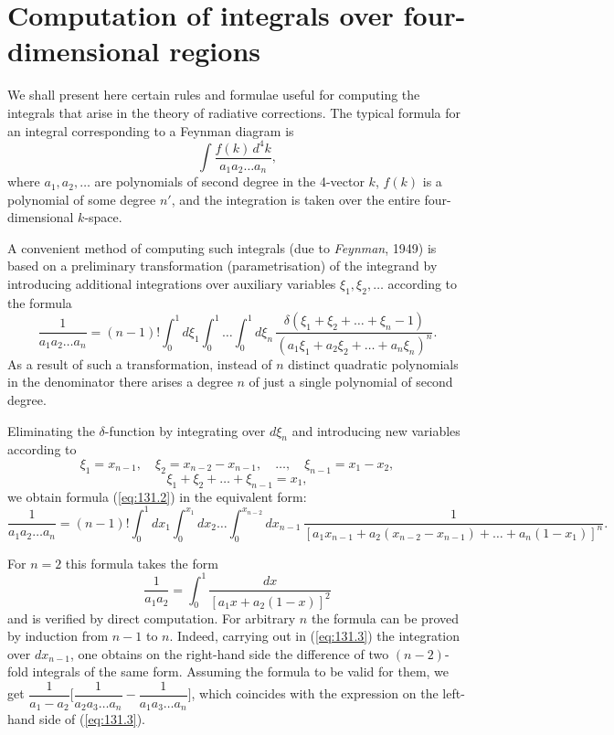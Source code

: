 
\section{Computation of integrals over four-dimensional regions}


We shall present here certain rules and formulae useful for computing the integrals that arise in the theory of radiative corrections. The typical formula for an integral corresponding to a Feynman diagram is
\begin{equation}
\int \frac{f(k)\,d^4k}{a_1 a_2 \ldots a_n},
\label{eq:131.1}
\end{equation}
where $a_1, a_2, \ldots$ are polynomials of second degree in the 4-vector $k$, $f(k)$ is a polynomial of some degree $n'$, and the integration is taken over the entire four-dimensional $k$-space.

A convenient method of computing such integrals (due to \emph{Feynman}, 1949) is based on a preliminary transformation (parametrisation) of the integrand by introducing additional integrations over auxiliary variables $\xi_1, \xi_2, \ldots$ according to the formula
\begin{equation}
\frac{1}{a_1 a_2 \ldots a_n} = (n-1)! \int_0^1 d\xi_1 \int_0^1 \ldots \int_0^1 d\xi_n \,\frac{\delta(\xi_1 + \xi_2 + \ldots + \xi_n - 1)}{(a_1\xi_1 + a_2\xi_2 + \ldots + a_n\xi_n)^n}.
\label{eq:131.2}
\end{equation}
As a result of such a transformation, instead of $n$ distinct quadratic polynomials in the denominator there arises a degree $n$ of just a single polynomial of second degree.

Eliminating the $\delta$-function by integrating over $d\xi_n$ and introducing new variables according to
\[
\xi_1 = x_{n-1},\quad \xi_2 = x_{n-2} - x_{n-1},\quad \ldots, \quad \xi_{n-1} = x_1 - x_2,
\]
\[
\xi_1 + \xi_2 + \ldots + \xi_{n-1} = x_1,
\]
we obtain formula (\ref{eq:131.2}) in the equivalent form:
\begin{equation}
\frac{1}{a_1 a_2 \ldots a_n} = (n-1)! \int_0^1 dx_1 \int_0^{x_1} dx_2 \ldots \int_0^{x_{n-2}} dx_{n-1}\,\frac{1}{[a_1 x_{n-1} + a_2(x_{n-2} - x_{n-1}) + \ldots + a_n(1 - x_1)]^n}.
\label{eq:131.3}
\end{equation}


For $n = 2$ this formula takes the form
\begin{equation}
\frac{1}{a_1 a_2} = \int_0^1 \frac{dx}{[a_1 x + a_2(1-x)]^2}
\label{eq:131.4}
\end{equation}
and is verified by direct computation. For arbitrary $n$ the formula can be proved by induction from $n - 1$ to $n$. Indeed, carrying out in (\ref{eq:131.3}) the integration over $dx_{n-1}$, one obtains on the right-hand side the difference of two $(n-2)$-fold integrals of the same form. Assuming the formula to be valid for them, we get $\dfrac{1}{a_1 - a_2}\biggl[\dfrac{1}{a_2 a_3 \ldots a_n} - \dfrac{1}{a_1 a_3 \ldots a_n}\biggr]$, which coincides with the expression on the left-hand side of (\ref{eq:131.3}).

